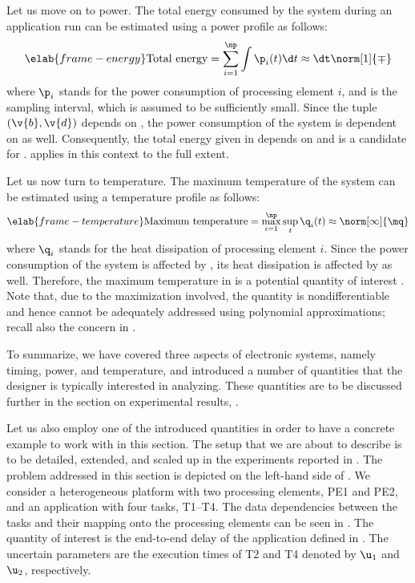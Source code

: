 Let us move on to power. The total energy consumed by the system during an
application run can be estimated using a power profile \mp as follows:
\begin{equation} \elab{frame-energy}
  \text{Total energy}
  = \sum_{i = 1}^\np \int \p_i(t) \d t
  \approx \dt \norm[1]{\mp}
\end{equation}
where $\p_i$ stands for the power consumption of processing element $i$, and \dt
is the sampling interval, which is assumed to be sufficiently small. Since the
tuple $(\v{b}, \v{d})$ depends on \vu, the power consumption of the system is
dependent on \vu as well. Consequently, the total energy given in
 depends on \vu and is a candidate for \g.
 applies in this context to the full extent.

Let us now turn to temperature. The maximum temperature of the system can be
estimated using a temperature profile \mq as follows:
\begin{equation} \elab{frame-temperature}
  \text{Maximum temperature}
  = \max_{i = 1}^\np \sup_{t} \q_i(t)
  \approx \norm[\infty]{\mq}
\end{equation}
where $\q_i$ stands for the heat dissipation of processing element $i$. Since
the power consumption of the system is affected by \vu, its heat dissipation is
affected by \vu as well. Therefore, the maximum temperature in
 is a potential quantity of interest \g. Note that, due
to the maximization involved, the quantity is nondifferentiable and hence cannot
be adequately addressed using polynomial approximations; recall also the concern
in .

To summarize, we have covered three aspects of electronic systems, namely
timing, power, and temperature, and introduced a number of quantities that the
designer is typically interested in analyzing. These quantities are to be
discussed further in the section on experimental results, .

Let us also employ one of the introduced quantities in order to have a concrete
example to work with in this section. The setup that we are about to describe is
to be detailed, extended, and scaled up in the experiments reported in
. The problem addressed in this section is depicted on the
left-hand side of . We consider a heterogeneous platform
with two processing elements, PE1 and PE2, and an application with four tasks,
T1--T4. The data dependencies between the tasks and their mapping onto the
processing elements can be seen in . The quantity of
interest \g is the end-to-end delay of the application defined in
. The uncertain parameters \vu are the execution times of T2
and T4 denoted by $\u_1$ and $\u_2$, respectively.

